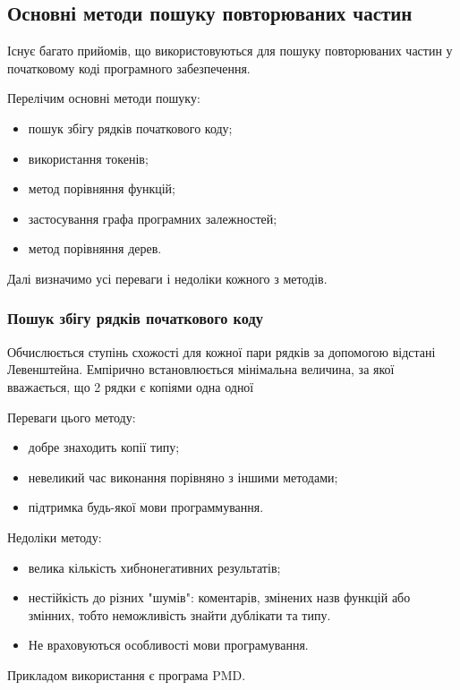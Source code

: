 \documentclass[a4paper, 14pt]{article}
\newcommand{\RNum}[1]{\uppercase\expandafter{\romannumeral #1\relax}}
\begin{document}
\subsection{Основні методи пошуку повторюваних частин}
Існує багато прийомів, що використовуються для пошуку повторюваних частин у початковому коді програмного забезпечення.

Перелічим основні методи пошуку:
\begin{itemize}
	\item пошук збігу рядків початкового коду; 
	\item використання токенів;
	\item метод порівняння функцій;
	\item застосування графа програмних залежностей;
	\item метод порівняння дерев.
\end{itemize}
Далі визначимо усі переваги і недоліки кожного з методів.

\subsubsection{Пошук збігу рядків початкового коду}
Обчислюється ступінь схожості для кожної пари рядків за допомогою відстані Левенштейна. Емпірично встановлюється мінімальна величина, за якої вважається, що 2 рядки є копіями одна одної

Переваги цього методу:  
\begin{itemize}
\item добре знаходить копії \RNum{1} типу;
\item невеликий час виконання порівняно з іншими методами;
\item підтримка будь-якої мови программування.
\end{itemize}

Недоліки методу:
\begin{itemize}
\item велика кількість хибнонегативних результатів;
\item нестійкість до різних "шумів": коментарів, змінених назв функцій або змінних, тобто неможливість знайти дублікати \RNum{2} та \RNum{3} типу. 
\item Не враховуються особливості мови програмування.
\end{itemize}
Прикладом використання є програма PMD.
\end{document}
